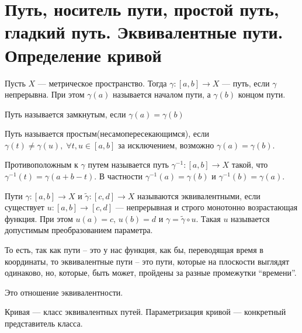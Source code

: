 \section{Путь, носитель пути, простой путь, гладкий путь. Эквивалентные пути. Определение кривой}

\begin{conj}
    Пусть $X$ --- метрическое пространство. Тогда
    $\gamma\colon [a, b] \to X$ --- путь, если $\gamma$ непрерывна. При этом $\gamma(a)$ называется началом пути, а $\gamma(b)$ концом пути.
  \end{conj}
  
  \begin{conj}
    Путь называется замкнутым, если $\gamma(a) = \gamma(b)$
  \end{conj}
  
  \begin{conj}
    Путь называется простым(несамопересекающимся), если  $\gamma(t) \neq \gamma(u),\; \forall t, u \in [a, b]$ за исключением, возможно $\gamma(a) = \gamma(b)$.
  \end{conj}
  
  \begin{conj}
    Противоположным к $\gamma$ путем называется путь $\gamma^{-1}\colon [a, b] \to X$ такой, что $\gamma^{-1}(t) = \gamma(a + b - t)$. В частности $\gamma^{-1}(a) = \gamma(b)$ и $\gamma^{-1}(b) = \gamma(a)$.
  \end{conj}
  
  \begin{conj}
    Пути $\gamma\colon[a, b] \to X$ и $\widetilde{\gamma}\colon[c, d] \to X$ называются эквивалентными, если существует $u\colon [a, b] \to [c, d]$ --- непрерывная и строго монотонно возрастающая функция. При этом $u(a) = c,\, u(b) = d$ и $\gamma = \widetilde{\gamma} \circ u$.
    Такая $u$ называется допустимым преобразованием параметра.
  \end{conj}

  То есть, так как пути -- это у нас функция, как бы, переводящая время в координаты, то эквивалентные пути -- это пути, которые на плоскости выглядят
  одинаково, но, которые, быть может, пройдены за разные промежутки ``времени''.

  \begin{notice}
    Это отношение эквивалентности.
  \end{notice}
  
  \begin{conj}
    Кривая --- класс эквивалентных путей. Параметризация кривой --- конкретный представитель класса.
  \end{conj}
  
